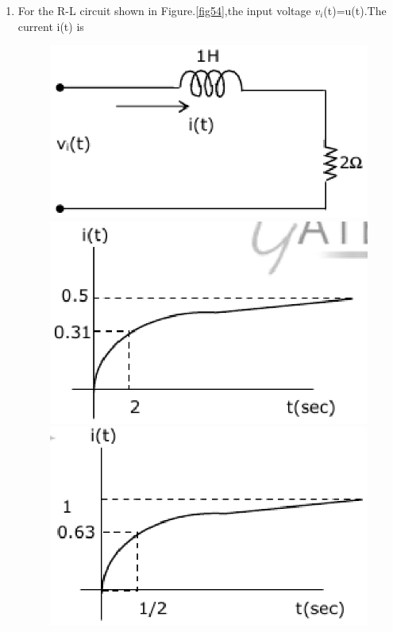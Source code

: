 \documentclass[journal,12pt,twocolumn]{IEEEtran}
\begin{document}
\begin{enumerate}
\item For the R-L circuit shown in Figure.\ref{fig54},the input voltage $v_{i}$(t)=u(t).The current i(t) is
\begin{figure}[!h]
\begin{center}
\includegraphics[scale=0.7]{./figs/fig54a.eps}
\includegraphics[scale=0.7]{./figs/fig54b.eps}
\includegraphics[scale=0.7]{./figs/fig54c.eps}

\end{center}
\end{figure}
\end{enumerate}
\end{document}
